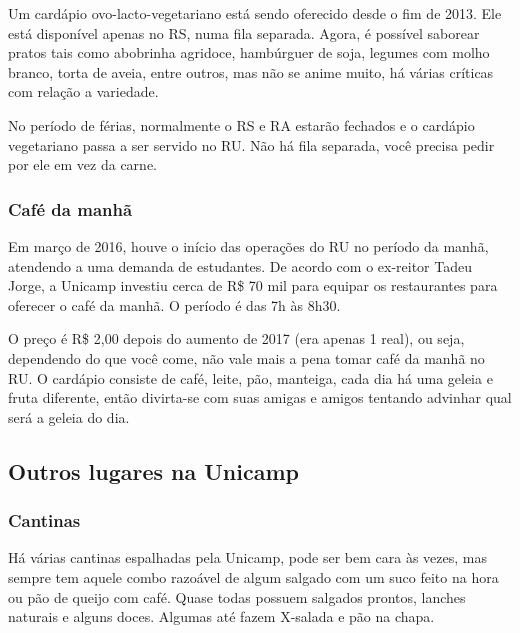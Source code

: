Um cardápio ovo-lacto-vegetariano está sendo oferecido desde o fim de 2013. Ele
está disponível apenas no RS, numa fila separada. Agora, é possível saborear
pratos tais como abobrinha agridoce, hambúrguer de soja, legumes com molho
branco, torta de aveia, entre outros, mas não se anime muito, há várias
críticas com relação a variedade.

No período de férias, normalmente o RS e RA estarão fechados e o cardápio
vegetariano passa a ser servido no RU. Não há fila separada, você precisa pedir
por ele em vez da carne.

\subsubsection{Café da manhã}

Em março de 2016, houve o início das operações do RU no período da manhã,
atendendo a uma demanda de estudantes. De acordo com o ex-reitor Tadeu Jorge,
a Unicamp investiu cerca de R\$ 70 mil para equipar os restaurantes para
oferecer o café da manhã. O período é das 7h às 8h30.

O preço é R\$ 2,00 depois do aumento de 2017 (era apenas 1 real), ou seja,
dependendo do que você come, não vale mais a pena tomar café da manhã no RU. O
cardápio consiste de café, leite, pão, manteiga, cada dia há uma geleia e fruta
diferente, então divirta-se com suas amigas e amigos tentando advinhar qual
será a geleia do dia.


\subsection{Outros lugares na Unicamp}

\subsubsection{Cantinas}

Há várias cantinas espalhadas pela Unicamp, pode ser bem cara às vezes, mas
sempre tem aquele combo razoável de algum salgado com um suco feito na hora ou
pão de queijo com café. Quase todas possuem salgados prontos, lanches naturais
e alguns doces. Algumas até fazem X-salada e pão na chapa.

